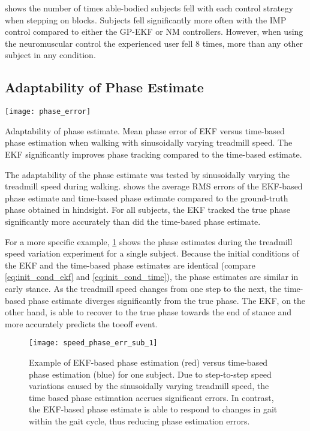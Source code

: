 shows the number of times able-bodied subjects fell
with each control strategy when stepping on blocks. Subjects fell significantly
more often with the IMP control compared to either the GP-EKF or NM controllers.
However, when using the neuromuscular control the experienced user fell 8 times,
more than any other subject in any condition.

\subsection{Adaptability of Phase Estimate}

\begin{marginfigure}
    \centering
    \texttt{[image: phase\_error]} 
    \caption[Adaptability of phase estimate]{Adaptability of phase estimate.
    Mean phase error of EKF versus time-based phase estimation when walking with
    sinusoidally varying treadmill speed. The EKF significantly improves phase
    tracking compared to the time-based
    estimate.}\label{fig:speed_phase_err_mean}
\end{marginfigure}
The adaptability of the phase estimate was tested by sinusoidally varying the
treadmill speed during walking.  shows the
average RMS errors of the EKF-based phase estimate and time-based phase estimate
compared to the ground-truth phase obtained in hindsight. For all subjects, the
EKF tracked the true phase significantly more accurately than did the time-based
phase estimate.

For a more specific example, \cref{fig:speed_phase_est_sub_1} shows the phase
estimates during the treadmill speed variation experiment for a single subject.
Because the initial conditions of the EKF and the time-based phase estimates are
identical (compare \cref{eq:init_cond_ekf} and \cref{eq:init_cond_time}), the
phase estimates are similar in early stance. As the treadmill speed changes from
one step to the next, the time-based phase estimate diverges significantly from
the true phase. The EKF, on the other hand, is able to recover to the true phase
towards the end of stance and more accurately predicts the toeoff event.
\begin{figure}[t]
    \centering
    \texttt{[image: speed\_phase\_err\_sub\_1]} 
    \caption[Example of EKF-based phase estimation versus time-based phase
    estimation for one subject]{Example of EKF-based phase estimation (red)
    versus time-based phase estimation (blue) for one subject. Due to
    step-to-step speed variations caused by the sinusoidally varying treadmill
    speed, the time based phase estimation accrues significant errors.  In
    contrast, the EKF-based phase estimate is able to respond to changes in gait
    within the gait cycle, thus reducing phase estimation
    errors.}\label{fig:speed_phase_est_sub_1}
\end{figure}

